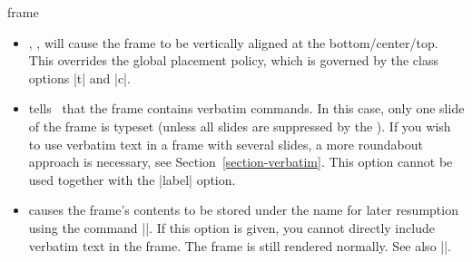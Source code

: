 \begin{environment}{{frame}%
    }
\begin{frame}[<+->][plain]
\begin{frame}[plain]
\begin{itemize}
    The use of this  option \emph{evil}. In a (good) presentation you
    prepare each slide carefully and think twice before putting something
    on a certain slide rather than on some different slide. Using the
    |allowframebreaks| option invites the creation of horrible, endless
    presentations that resemble more a ``paper projected on the wall''
    than a presentation. Nevertheless, the option does have its
    uses. Most noticeably, it can be convenient for automatically
    splitting bibliographies or long equations.

    \example
\begin{verbatim}
\begin{frame}[allowframebreaks]
  \frametitle{References}

  \begin{thebibliography}{XX}

  \bibitem...
  \bibitem...
    ...
  \bibitem...
  \end{thebibliography}
\end{frame}
\end{verbatim}
    \example
\begin{verbatim}
\begin{frame}[allowframebreaks,allowdisplaybreaks]
  \frametitle{A Long Equation}

  \begin{align}
    \zeta(2) &= 1 + 1/4 + 1/9 + \cdots \\
    &= ... \\
    ...
    &= \pi^2/6.
  \end{align}
\end{frame}
\end{verbatim}
  \item
    , ,  will cause the frame
    to be vertically aligned at the bottom/center/top. This overrides
    the global placement policy, which is governed by the class
    options |t| and |c|.
  \item
     tells \beamer\ that the frame
    contains verbatim commands. In this case, only one slide of
    the frame is typeset (unless all slides are suppressed by the
    ). If you wish to use verbatim text in
    a frame with several slides, a more roundabout approach is
    necessary, see Section~\ref{section-verbatim}. This option cannot
    be used together with the |label| option.
    
  \item
     causes the frame's contents to
    be stored under the name  for later resumption using
    the command |\againframe|. If this option is given, you cannot
    directly include verbatim text in the frame. The frame is still rendered
    normally. See also |\againframe|.


\end{itemize}
\end{frame}
\end{frame}
\end{environment}
